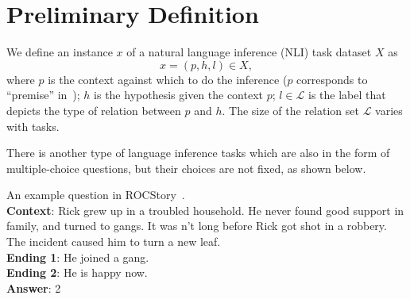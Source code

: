 \section{Preliminary Definition}
\label{sec:formulation}
We define an instance $x$ of a natural language inference (NLI) task 
dataset $X$ as
\begin{equation}
    x = (p, h, l) \in X,
\end{equation}
\noindent
where $p$ is the context against which to do the inference ($p$ corresponds 
to ``premise'' in~);
$h$ is the hypothesis given the context $p$; 
$l \in \mathcal{L}$ is the label that 
depicts the type of relation between $p$ and $h$. 
The size of the relation set $\mathcal{L}$ varies with tasks. 



There is another type of language inference tasks which are also in 
the form of multiple-choice questions, but their choices are not fixed, 
as shown below. 
\begin{example}\label{exp:roc}
An example question in ROCStory~\cite{mostafazadeh2016corpus}.\\
\textbf{Context}: Rick grew up in a troubled household. 
He never found good support in family, and turned to gangs.           
It was n't long before Rick got shot in a robbery.             
The incident caused him to turn a new leaf.\\
\textbf{Ending 1}: He joined a gang. \\
\textbf{Ending 2}:  He is happy now.\\
\textbf{Answer}: 2
\end{example}

